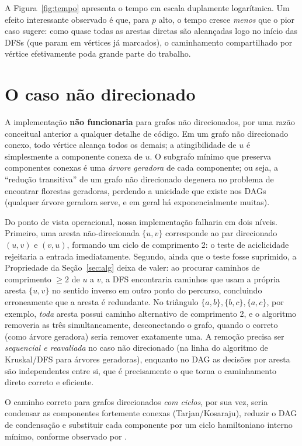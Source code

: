 \documentclass{sbc2023}%
\begin{document}
A Figura~\ref{fig:tempo} apresenta o tempo em escala duplamente logarítmica. Um efeito interessante observado é que, para $p$ alto, o tempo cresce \emph{menos} que o pior caso sugere: como quase todas as arestas diretas são alcançadas logo no início das DFSs (que param em vértices já marcados), o caminhamento compartilhado por vértice efetivamente poda grande parte do trabalho.

\section{O caso não direcionado}
\label{sec:nao-dir}

A implementação \textbf{não funcionaria} para grafos não direcionados, por uma razão conceitual anterior a qualquer detalhe de código. Em um grafo não direcionado conexo, todo vértice alcança todos os demais; a atingibilidade de $u$ é simplesmente a componente conexa de $u$. O subgrafo mínimo que preserva componentes conexas é uma \emph{árvore geradora} de cada componente; ou seja, a ``redução transitiva'' de um grafo não direcionado degenera no problema de encontrar florestas geradoras, perdendo a unicidade que existe nos DAGs (qualquer árvore geradora serve, e em geral há exponencialmente muitas).

Do ponto de vista operacional, nossa implementação falharia em dois níveis. Primeiro, uma aresta não-direcionada $\{u,v\}$ corresponde ao par direcionado $(u,v)$ e $(v,u)$, formando um ciclo de comprimento 2: o teste de aciclicidade rejeitaria a entrada imediatamente. Segundo, ainda que o teste fosse suprimido, a Propriedade da Seção~\ref{sec:alg} deixa de valer: ao procurar caminhos de comprimento $\geq 2$ de $u$ a $v$, a DFS encontraria caminhos que usam a própria aresta $\{u,v\}$ no sentido inverso em outro ponto do percurso, concluindo erroneamente que a aresta é redundante. No triângulo $\{a,b\},\{b,c\},\{a,c\}$, por exemplo, \emph{toda} aresta possui caminho alternativo de comprimento 2, e o algoritmo removeria as três simultaneamente, desconectando o grafo, quando o correto (como árvore geradora) seria remover exatamente uma. A remoção precisa ser \emph{sequencial e reavaliada} no caso não direcionado (na linha do algoritmo de Kruskal/DFS para árvores geradoras), enquanto no DAG as decisões por aresta são independentes entre si, que é precisamente o que torna o caminhamento direto correto e eficiente.

O caminho correto para grafos direcionados \emph{com ciclos}, por sua vez, seria condensar as componentes fortemente conexas (Tarjan/Kosaraju), reduzir o DAG de condensação e substituir cada componente por um ciclo hamiltoniano interno mínimo, conforme observado por \cite{aho1972}.
\end{document}
